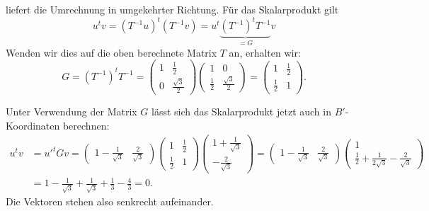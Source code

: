 \begin{loesung}
\begin{teilaufgaben}
liefert die Umrechnung in umgekehrter Richtung.
Für das Skalarprodukt gilt
\[
u^t v
=
(T^{-1}u)^t(T^{-1}v)
=
u^t
\underbrace{ (T^{-1})^t T^{-1}}_{\displaystyle =G} v
\]
Wenden wir dies auf die oben berechnete Matrix $T$ an, erhalten wir:
\[
G
=
(T^{-1})^tT^{-1}
=
\begin{pmatrix}1&\frac12\\0&\frac{\sqrt{3}}2\end{pmatrix}
\begin{pmatrix}1&0\\\frac12&\frac{\sqrt{3}}2\end{pmatrix}
=
\begin{pmatrix} 1&\frac12\\\frac12&1 \end{pmatrix}.
\]
\item
Unter Verwendung der Matrix $G$ lässt sich das Skalarprodukt jetzt auch
in $B'$-Koordinaten berechnen:
\begin{align*}
u^tv
&=
u'^tGv
=
\begin{pmatrix} 1-\frac1{\sqrt{3}}&\frac2{\sqrt{3}} \end{pmatrix}
\begin{pmatrix} 1&\frac12\\\frac12&1 \end{pmatrix}
\begin{pmatrix} 1+\frac1{\sqrt{3}}\\-\frac2{\sqrt{3}} \end{pmatrix}
=
\begin{pmatrix} 1-\frac1{\sqrt{3}}&\frac2{\sqrt{3}} \end{pmatrix}
\begin{pmatrix} 1\\
\frac12+\frac1{2\sqrt{3}}-\frac2{\sqrt{3}}
\end{pmatrix}
\\
&=
1-\frac1{\sqrt{3}}
+
\frac1{\sqrt{3}}+\frac13-\frac43
=
0.
\end{align*}
Die Vektoren stehen also senkrecht aufeinander.
\qedhere
\end{teilaufgaben}
\end{loesung}

